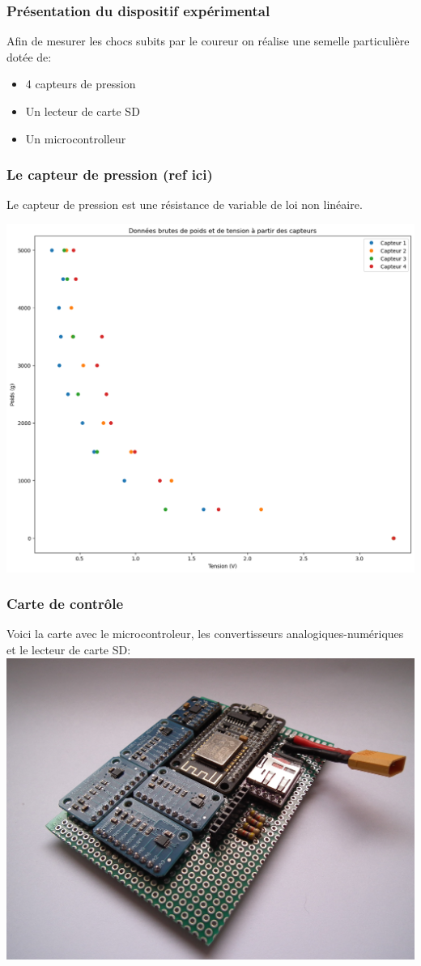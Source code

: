 \begin{frame}
\frametitle{Présentation du dispositif expérimental}
Afin de mesurer les chocs subits par le coureur on réalise une semelle particulière dotée de:
\begin{itemize}
\item 4 capteurs de pression
\item Un lecteur de carte SD
\item Un microcontrolleur
\end{itemize}
\end{frame}

\begin{frame}
\frametitle{Le capteur de pression (ref ici)}
Le capteur de pression est une résistance de variable de loi non linéaire.

\includegraphics[scale=0.3]{./figures/cal_00.png}
\end{frame}

\begin{frame}
\frametitle{Carte de contrôle}
Voici la carte avec le microcontroleur, les convertisseurs analogiques-numériques et le lecteur de carte SD:
\includegraphics[width=\textwidth]{./figures/carte_00.jpg}

\end{frame}

